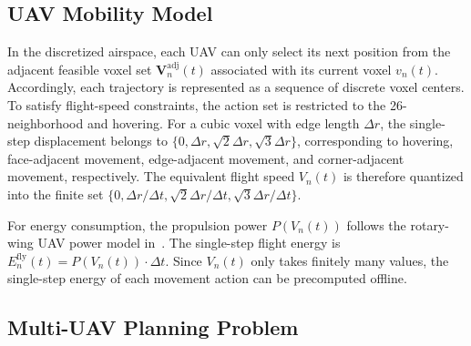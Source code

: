 \documentclass[lettersize,journal]{IEEEtran}
\begin{document}
\subsection{UAV Mobility Model}

In the discretized airspace, each UAV can only select its next position from the adjacent feasible voxel set $\mathbf{V}_n^{\mathrm{adj}}(t)$ associated with its current voxel $v_n(t)$. Accordingly, each trajectory is represented as a sequence of discrete voxel centers. To satisfy flight-speed constraints, the action set is restricted to the 26-neighborhood and hovering. For a cubic voxel with edge length $\Delta r$, the single-step displacement belongs to $\{0,\Delta r,\sqrt{2}\Delta r,\sqrt{3}\Delta r\}$, corresponding to hovering, face-adjacent movement, edge-adjacent movement, and corner-adjacent movement, respectively. The equivalent flight speed $V_n(t)$ is therefore quantized into the finite set $\{0,\Delta r/\Delta t,\sqrt{2}\Delta r/\Delta t,\sqrt{3}\Delta r/\Delta t\}$.

For energy consumption, the propulsion power $P(V_n(t))$ follows the rotary-wing UAV power model in~\cite{ref17}. The single-step flight energy is $E_n^{\mathrm{fly}}(t)=P(V_n(t))\cdot\Delta t$. Since $V_n(t)$ only takes finitely many values, the single-step energy of each movement action can be precomputed offline.

\subsection{Multi-UAV Planning Problem}
\end{document}
